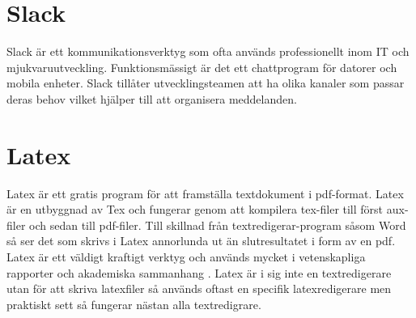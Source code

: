 \section{Slack}
Slack är ett kommunikationsverktyg som ofta används professionellt inom IT och mjukvaruutveckling. Funktionsmässigt är det ett chattprogram för datorer och mobila enheter. Slack tillåter utvecklingsteamen att ha olika kanaler som passar deras behov vilket hjälper till att organisera meddelanden. \cite{Slack}

\section{Latex}
Latex är ett gratis program för att framställa textdokument i pdf-format. Latex är en utbyggnad av Tex och fungerar genom att kompilera tex-filer till först aux-filer och sedan till pdf-filer. Till skillnad från textredigerar-program såsom Word så ser det som skrivs i Latex annorlunda ut än slutresultatet i form av en pdf. Latex är ett väldigt kraftigt verktyg och används mycket i vetenskapliga rapporter och akademiska sammanhang \cite{ctan}. Latex är i sig inte en textredigerare utan för att skriva latexfiler så används oftast en specifik latexredigerare men praktiskt sett så fungerar nästan alla textredigrare.
